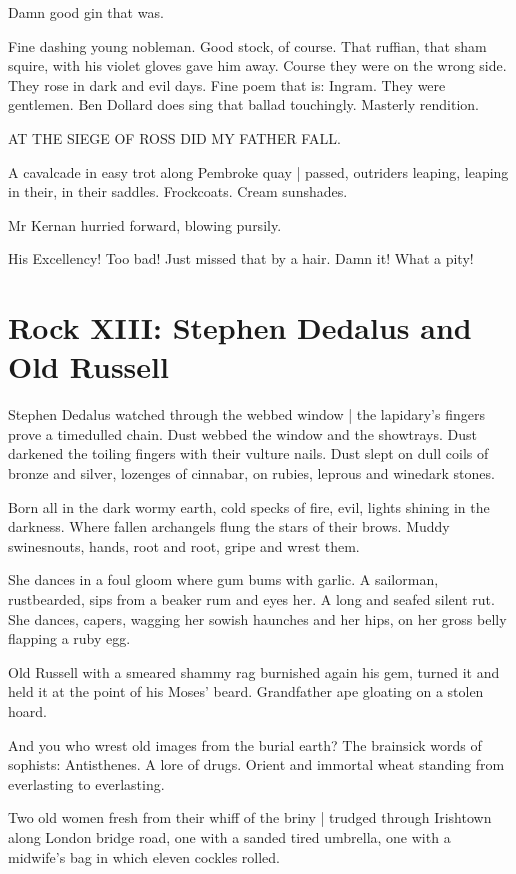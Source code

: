 Damn good gin that was.

Fine dashing young nobleman.
Good stock, of course.
That ruffian, that sham squire, with his violet gloves
gave him away.
Course they were on the wrong side.
They rose in dark and evil days.
Fine poem that is:
Ingram.
They were gentlemen.
Ben Dollard does sing that ballad touchingly.
Masterly rendition.


    AT THE SIEGE OF ROSS DID MY FATHER FALL.


A cavalcade in easy trot along Pembroke quay |
passed,
outriders leaping, leaping in their, in their saddles.
Frockcoats.
Cream sunshades.

Mr Kernan hurried forward,
blowing pursily.

His Excellency!
Too bad!
Just missed that by a hair.
Damn it!
What a pity!


\section*{Rock XIII: Stephen Dedalus and Old Russell}


Stephen Dedalus watched through the webbed window |
the lapidary's fingers prove a timedulled chain.
Dust webbed the window and the showtrays.
Dust darkened the toiling fingers with their vulture nails.
Dust slept on dull coils of bronze and silver,
lozenges of cinnabar,
on rubies,
leprous and winedark stones.

Born all in the dark wormy earth,
cold specks of fire,
evil, lights shining in the darkness.
Where fallen archangels flung the stars of their brows.
Muddy swinesnouts,
hands,
root and root,
gripe and wrest them.

She dances in a foul gloom where gum bums with garlic.
A sailorman, rustbearded, sips from a beaker rum and eyes her.
A long and seafed silent rut.
She dances, capers,
wagging her sowish haunches and her hips,
on her gross belly flapping a ruby egg.

Old Russell with a smeared shammy rag burnished again his gem,
turned it
and held it at the point of his Moses' beard.
Grandfather ape gloating on a stolen hoard.

And you who wrest old images from the burial earth?
The brainsick words of sophists:
Antisthenes.
A lore of drugs.
Orient and immortal wheat
standing from everlasting to everlasting.

Two old women
fresh from their whiff of the briny |
trudged through Irishtown along London bridge road,
one with a sanded tired umbrella,
one with a midwife's bag
in which eleven cockles rolled.

